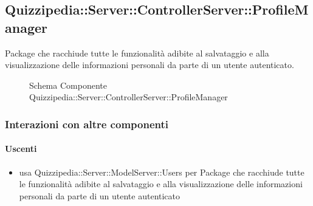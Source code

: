 \subsection{Quizzipedia::Server::ControllerServer::ProfileManager}
Package che racchiude tutte le funzionalità adibite al salvataggio e alla visualizzazione delle informazioni personali da parte di un utente autenticato.
\begin{figure}[H]
\centering
\noindent{}
\caption[Schema Componente Quizzipedia::Server::ControllerServer::ProfileManager]{Schema Componente Quizzipedia::Server::ControllerServer::ProfileManager}
\end{figure}
\subsubsection{Interazioni con altre componenti}
\paragraph{Uscenti}
\begin{itemize}
\item usa Quizzipedia::Server::ModelServer::Users per Package che racchiude tutte le funzionalità adibite al salvataggio e alla visualizzazione delle informazioni personali da parte di un utente autenticato
\end{itemize}
